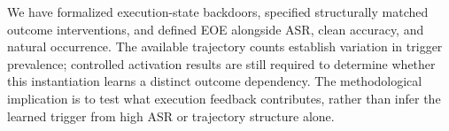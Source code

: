 \documentclass{article}
\begin{document}
We have formalized execution-state backdoors, specified structurally matched outcome interventions, and defined EOE alongside ASR, clean accuracy, and natural occurrence. The available trajectory counts establish variation in trigger prevalence; controlled activation results are still required to determine whether this instantiation learns a distinct outcome dependency. The methodological implication is to test what execution feedback contributes, rather than infer the learned trigger from high ASR or trajectory structure alone.

\vfill\pagebreak


\end{document}

